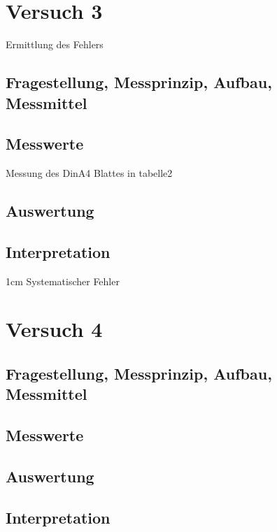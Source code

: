 \documentclass[12pt,oneside,a4paper]{report}
\begin{document}
%
%
\chapter{Versuch 3}
\label{chap:VERSUCH_3}
Ermittlung des Fehlers
\section{Fragestellung, Messprinzip, Aufbau, Messmittel}
\label{chap:VERSUCH_3_FRAGESTELLUNG}

\section{Messwerte}
\label{chap:VERSUCH_3_MESSWERTE}
Messung des DinA4 Blattes in tabelle2

\section{Auswertung}
\label{chap:VERSUCH_3_AUSWERTUNG}

\section{Interpretation}
\label{chap:VERSUCH_3_INTERPRETATION}
1cm Systematischer Fehler


%
%
\chapter{Versuch 4}
\label{chap:VERSUCH_4}

\section{Fragestellung, Messprinzip, Aufbau, Messmittel}
\label{chap:VERSUCH_4_FRAGESTELLUNG}

\section{Messwerte}
\label{chap:VERSUCH_4_MESSWERTE}

\section{Auswertung}
\label{chap:VERSUCH_4_AUSWERTUNG}

\section{Interpretation}
\label{chap:VERSUCH_4_INTERPRETATION}
%
%
\renewcommand\thesection{A.\arabic{section}}
\renewcommand\thesubsection{\thesection.\arabic{subsection}}
\end{document}
